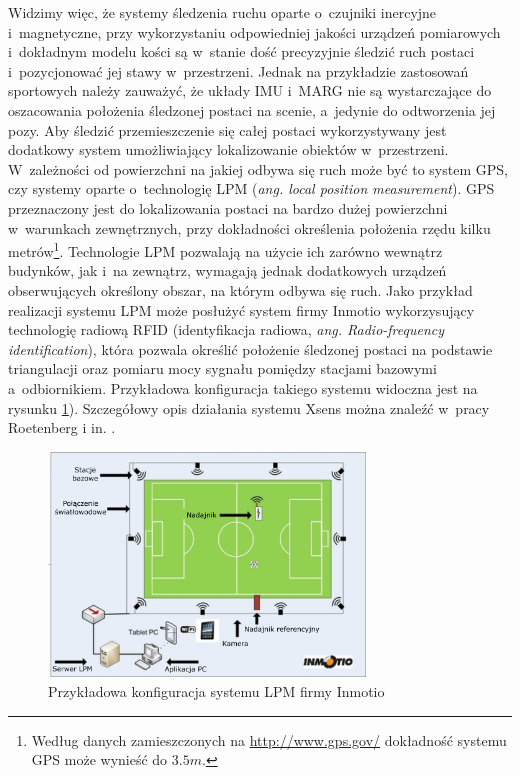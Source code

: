 Widzimy więc, że systemy śledzenia ruchu oparte o~czujniki inercyjne i~magnetyczne, przy wykorzystaniu odpowiedniej jakości urządzeń pomiarowych i~dokładnym modelu kości są w~stanie dość precyzyjnie śledzić ruch postaci i~pozycjonować jej stawy w~przestrzeni. Jednak na przykładzie zastosowań sportowych  należy zauważyć, że układy IMU i~MARG nie są wystarczające do oszacowania położenia śledzonej postaci na scenie, a~jedynie do odtworzenia jej pozy. Aby śledzić przemieszczenie się całej postaci wykorzystywany jest dodatkowy system umożliwiający lokalizowanie obiektów w~przestrzeni. W~zależności od powierzchni na jakiej odbywa się ruch może być to system GPS, czy systemy oparte o~technologię LPM (\emph{ang. local position measurement}). GPS przeznaczony jest do lokalizowania postaci na bardzo dużej powierzchni w~warunkach zewnętrznych, przy dokładności określenia położenia rzędu kilku metrów\footnote{Według danych zamieszczonych na \url{http://www.gps.gov/} dokładność systemu GPS może wynieść do $3.5m$.}. Technologie LPM pozwalają na użycie ich zarówno wewnątrz budynków, jak i~na zewnątrz, wymagają jednak dodatkowych urządzeń obserwujących określony obszar, na którym odbywa się ruch. Jako przykład realizacji systemu LPM może posłużyć system firmy Inmotio wykorzysujący technologię radiową RFID (identyfikacja radiowa, \emph{ang. Radio-frequency identification}), która pozwala określić położenie śledzonej postaci na podstawie triangulacji oraz pomiaru mocy sygnału pomiędzy stacjami bazowymi a~odbiornikiem. Przykładowa konfiguracja takiego systemu widoczna jest na rysunku \ref{fig:literature:footnote:inmotio:setup}). Szczegółowy opis działania systemu Xsens można znaleźć w~pracy Roetenberg i in. \cite{Roetenberg2009}.
					
\begin{savenotes}
	\begin{figure}[!htp]
		\centering	
		\includegraphics[width=0.75\textwidth]{images/lpm.png}
		\caption[Przykładowa konfiguracja systemu LPM firmy Inmotio]{Przykładowa konfiguracja systemu LPM firmy Inmotio}	
		\label{fig:literature:footnote:inmotio:setup}	
	\end{figure}
\end{savenotes}
							
